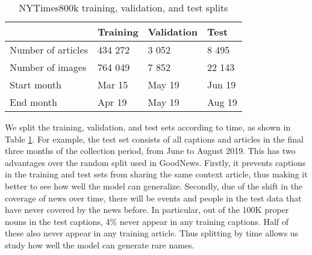 \begin{table}[t]
	\caption {NYTimes800k training, validation, and test splits}
	\label{tab:splits}
	\centering
	\begin{tabularx}{\linewidth}{lXXX}
		\toprule
		  & Training  &   Validation & Test \\
		\midrule
      Number of articles & 434 272 & 3 052 & 8 495 \\
      Number of images  & 764 049 & 7 852 & 22 143 \\
      Start month & Mar 15 & May 19 & Jun 19 \\
      End month & Apr 19 & May 19 & Aug 19 \\
		\bottomrule
	\end{tabularx}
\end{table}

We split the training, validation, and test sets according to time, as shown in
Table \ref{tab:splits}. For example, the test set consists of all captions and
articles in the final three months of the collection period, from June to
August 2019. This has two advantages over the random split used in GoodNews.
Firstly, it prevents captions in the training and test sets from sharing the
same context article, thus making it better to see how well the model can
generalize. Secondly, due of the shift in the coverage of news over time, there
will be events and people in the test data that have never covered by the news
before. In particular, out of the 100K proper nouns in the test captions, 4\%
never appear in any training captions. Half of these also never appear in any
training article. Thus splitting by time allows us study how well the model can
generate rare names.
